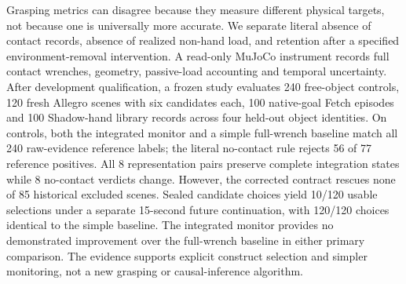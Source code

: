 Grasping metrics can disagree because they measure different physical targets,
not because one is universally more accurate. We separate literal absence of
contact records, absence of realized non-hand load, and retention after a
specified environment-removal intervention. A read-only MuJoCo instrument
records full contact wrenches, geometry, passive-load accounting and temporal
uncertainty. After development qualification, a frozen study evaluates 240
free-object controls, 120 fresh Allegro scenes with six candidates each, 100
native-goal Fetch episodes and 100 Shadow-hand library records across four
held-out object identities. On controls, both the integrated monitor and a
simple full-wrench baseline match all 240 raw-evidence reference labels;
the literal no-contact rule rejects 56 of 77 reference positives.
All 8 representation pairs preserve complete integration states while
8 no-contact verdicts change. However, the corrected contract rescues
none of 85 historical excluded scenes. Sealed candidate choices yield
10/120 usable selections under a separate 15-second future
continuation, with 120/120 choices identical to the simple baseline.
The integrated monitor provides no demonstrated improvement over the full-wrench baseline in either primary comparison. The evidence supports explicit construct selection and simpler monitoring, not a new grasping or causal-inference algorithm.
